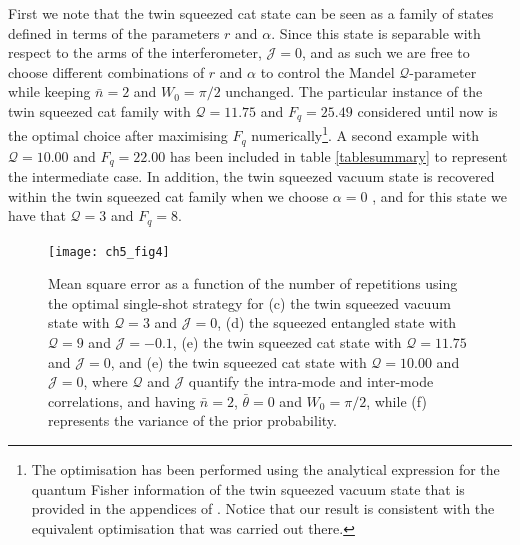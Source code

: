 First we note that the twin squeezed cat state can be seen as a family of states defined in terms of the parameters $r$ and $\alpha$. Since this state is separable with respect to the arms of the interferometer, $\mathcal{J} = 0$, and as such we are free to choose different combinations of $r$ and $\alpha$ to control the Mandel $\mathcal{Q}$-parameter while keeping $\bar{n}=2$ and $W_0=\pi/2$ unchanged. The particular instance of the twin squeezed cat family with $\mathcal{Q} = 11.75$ and $F_q = 25.49$ considered until now is the optimal choice after maximising $F_q$ numerically\footnote{The optimisation has been performed using the analytical expression for the quantum Fisher information of the twin squeezed vacuum state that is provided in the appendices of \cite{PaulProctor2016}. Notice that our result is consistent with the equivalent optimisation that was carried out there.}. A second example with $\mathcal{Q} = 10.00$ and $F_q = 22.00$ has been included in table \ref{tablesummary} to represent the intermediate case. In addition, the twin squeezed vacuum state is recovered within the twin squeezed cat family when we choose $\alpha = 0$ \cite{PaulProctor2016}, and for this state we have that $\mathcal{Q} = 3$ and $F_q = 8$. 

\begin{figure}[t]
\centering
\texttt{[image: ch5\_fig4]}
	\caption[Role of photon correlations in the non-asymptotic regime]{Mean square error as a function of the number of repetitions using the optimal single-shot strategy for (c) the twin squeezed vacuum state with $\mathcal{Q}=3$ and $\mathcal{J} = 0$, (d) the squeezed entangled state with $\mathcal{Q}=9$ and $\mathcal{J} = -0.1$, (e) the twin squeezed cat state with $\mathcal{Q}=11.75$ and $\mathcal{J} = 0$, and (e) the twin squeezed cat state with $\mathcal{Q}=10.00$ and $\mathcal{J} = 0$, where $\mathcal{Q}$ and $\mathcal{J}$ quantify the intra-mode and inter-mode correlations, and having $\bar{n}=2$, $\bar{\theta} = 0$ and $W_0 = \pi/2$, while (f) represents the variance of the prior probability.}
\label{correlations_figure}
\end{figure}

